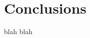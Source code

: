\documentclass[../main/Self-Stabilization.tex]{subfiles}
\begin{document}
\section{Conclusions}
blah blah
\end{document}
